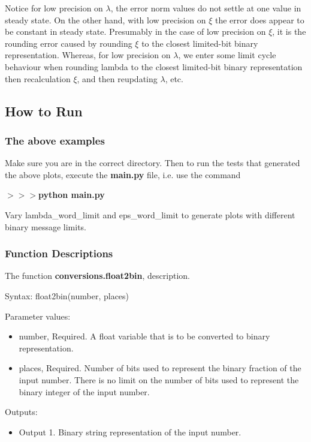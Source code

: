 \documentclass[12pt]{article}
\begin{document}
Notice for low precision on $\lambda$, the error norm values do not settle at one value in steady state. On the other hand, with low precision on $\xi$ the error does appear to be constant in steady state. Presumably in the case of low precision on $\xi$, it is the rounding error caused by rounding $\xi$ to the closest limited-bit binary representation. Whereas, for low precision on $\lambda$, we enter some limit cycle behaviour when rounding lambda to the closest limited-bit binary representation then recalculation $\xi$, and then reupdating $\lambda$, etc.

\subsection*{How to Run}

\subsubsection*{The above examples}

Make sure you are in the correct directory. Then to run the tests that generated the above plots, execute the \textbf{main.py} file, i.e. use the command

\noindent \textbf{$>>>$python main.py}

Vary lambda\_word\_limit and eps\_word\_limit to generate plots with different binary message limits.

\subsubsection*{Function Descriptions}

The function \textbf{conversions.float2bin}, description.

Syntax: float2bin(number, places)

Parameter values:
\begin{itemize}
	\item number, Required. A float variable that is to be converted to binary representation.
	\item places, Required. Number of bits used to represent the binary fraction of the input number. There is no limit on the number of bits used to represent the binary integer of the input number.
\end{itemize}

Outputs:
\begin{itemize}
	\item Output 1. Binary string representation of the input number. 
\end{itemize}
\end{document}
